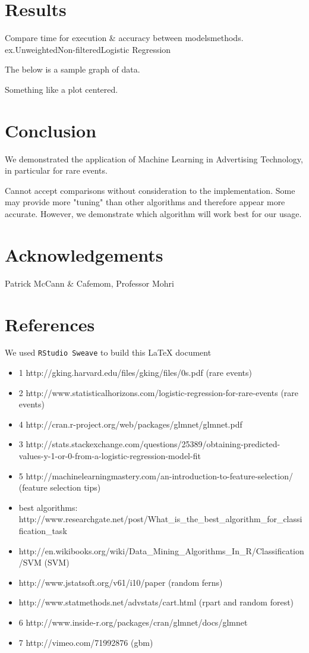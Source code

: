\documentclass[a4paper]{article}
\begin{document}
\begin{multicols}{2}
\section*{Results}
Compare time for execution \& accuracy between models\/methods. ex.Unweighted\/Non-filtered\/Logistic Regression

The below is a sample graph of data.
\begin{center}
Something like a plot centered.
\end{center}

\section*{Conclusion}
We demonstrated the application of Machine Learning in Advertising Technology, in particular for rare events.

Cannot accept comparisons without consideration to the implementation. Some may provide more "tuning" than other algorithms and therefore appear more accurate. However, we demonstrate which algorithm will work best for our usage.

\section*{Acknowledgements}
Patrick McCann \& Cafemom, Professor Mohri

\end{multicols}


\section*{References}
We used \texttt{RStudio Sweave} to build this \LaTeX{} document
\begin{itemize}
  \item 1 http://gking.harvard.edu/files/gking/files/0s.pdf (rare events)
  \item 2 http://www.statisticalhorizons.com/logistic-regression-for-rare-events (rare events)
  \item 4 http://cran.r-project.org/web/packages/glmnet/glmnet.pdf
  \item 3 http://stats.stackexchange.com/questions/25389/obtaining-predicted-values-y-1-or-0-from-a-logistic-regression-model-fit
  \item 5 http://machinelearningmastery.com/an-introduction-to-feature-selection/ (feature selection tips)
  \item best algorithms: http://www.researchgate.net/post/What\_is\_the\_best\_algorithm\_for\_classification\_task
  \item http://en.wikibooks.org/wiki/Data\_Mining\_Algorithms\_In\_R/Classification/SVM (SVM)
  \item http://www.jstatsoft.org/v61/i10/paper (random ferns)
  \item http://www.statmethods.net/advstats/cart.html (rpart and random forest)
  \item 6 http://www.inside-r.org/packages/cran/glmnet/docs/glmnet
  \item 7 http://vimeo.com/71992876 (gbm)
\end{itemize}
\end{document}
